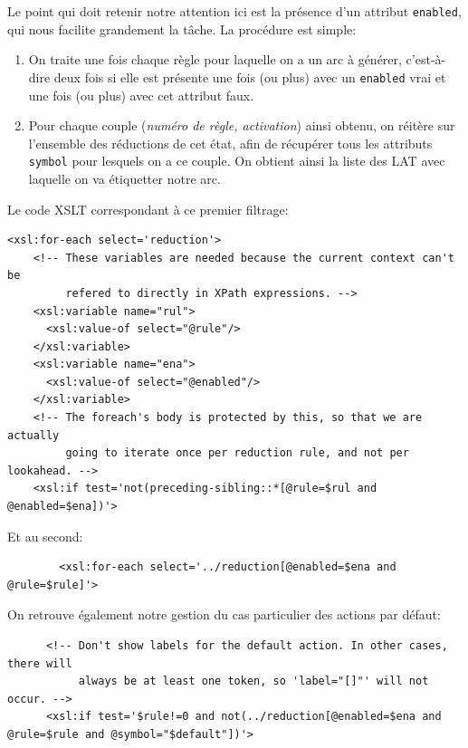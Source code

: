 \documentclass[a4paper,11pt,twoside,final]{article}
\begin{document}
  Le point qui doit retenir notre attention ici est la présence d'un attribut
  \texttt{enabled}, qui nous facilite grandement la tâche. La procédure est
  simple:

  \begin{enumerate}
    \item On traite une fois chaque règle pour laquelle on a un arc à générer,
      c'est-à-dire deux fois si elle est présente une fois (ou plus) avec un
      \texttt{enabled} vrai et une fois (ou plus) avec cet attribut faux.
    \item Pour chaque couple (\textit{numéro de règle, activation}) ainsi
      obtenu, on réitère sur l'ensemble des réductions de cet état, afin de
      récupérer tous les attributs \texttt{symbol} pour lesquels on a ce
      couple. On obtient ainsi la liste des LAT avec laquelle on va étiquetter
      notre arc.
  \end{enumerate}

  Le code XSLT correspondant à ce premier filtrage:

  \begin{verbatim}
<xsl:for-each select='reduction'>
    <!-- These variables are needed because the current context can't be
         refered to directly in XPath expressions. -->
    <xsl:variable name="rul">
      <xsl:value-of select="@rule"/>
    </xsl:variable>
    <xsl:variable name="ena">
      <xsl:value-of select="@enabled"/>
    </xsl:variable>
    <!-- The foreach's body is protected by this, so that we are actually
         going to iterate once per reduction rule, and not per lookahead. -->
    <xsl:if test='not(preceding-sibling::*[@rule=$rul and @enabled=$ena])'>
  \end{verbatim}

  Et au second:

  \begin{verbatim}
        <xsl:for-each select='../reduction[@enabled=$ena and @rule=$rule]'>
  \end{verbatim}

 On retrouve également notre gestion du cas particulier des actions par
  défaut:
  \begin{verbatim}
      <!-- Don't show labels for the default action. In other cases, there will
           always be at least one token, so 'label="[]"' will not occur. -->
      <xsl:if test='$rule!=0 and not(../reduction[@enabled=$ena and @rule=$rule and @symbol="$default"])'>
  \end{verbatim}
\end{document}
